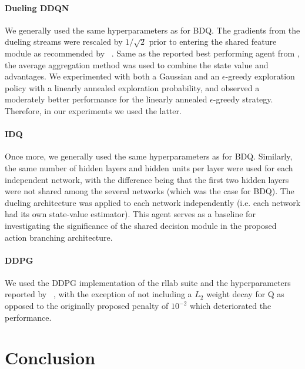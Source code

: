 \documentclass[letterpaper]{article}
\newcommand{\citet}[1]
{\citeauthor{#1}~\shortcite{#1}}
\newcommand{\citep}{\cite}
\begin{document}
\paragraph{Dueling DDQN}
We generally used the same hyperparameters as for BDQ. The gradients from the dueling streams were rescaled by $1/\sqrt{2}$ prior to entering the shared feature module as recommended by \citet{Wang:2016}. Same as the reported best performing agent from \citep{Wang:2016}, the average aggregation method was used to combine the state value and advantages. We experimented with both a Gaussian and an $\epsilon$-greedy exploration policy with a linearly annealed exploration probability, and observed a moderately better performance for the linearly annealed $\epsilon$-greedy strategy. Therefore, in our experiments we used the latter.

\paragraph{IDQ} 
Once more, we generally used the same hyperparameters as for BDQ. Similarly, the same number of hidden layers and hidden units per layer were used for each independent network, with the difference being that the first two hidden layers were not shared among the several networks (which was the case for BDQ). The dueling architecture was applied to each network independently (i.e. each network had its own state-value estimator). This agent serves as a baseline for investigating the significance of the shared decision module in the proposed action branching architecture.

\paragraph{DDPG} 
We used the DDPG implementation of the rllab suite \citep{Duan:2016benchmarking} and the hyperparameters reported by \citet{Lillicrap:2016ddpg}, with the exception of not including a $L_2$ weight decay for Q as opposed to the originally proposed penalty of $10^{-2}$ which deteriorated the performance.


\section{Conclusion}
\label{sec:conclusion}
\end{document}
